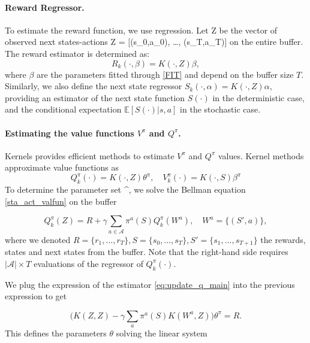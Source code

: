 \documentclass[
]{article}
\def\({}%
\def\){}%
\numberwithin{equation}{section}
\begin{document}
\paragraph*{Reward Regressor.} To estimate the reward function, we use regression. Let \(Z\) be the vector of observed next states-actions
\(Z = [(s_0,a_0), \dots, (s_T,a_T)]\) on the entire buffer. The reward estimator
is determined as:
\begin{equation} \label{eq:update_s_main}
R_{k}(\cdot, \beta) =   K(\cdot, Z)\beta,
\end{equation} where $\beta$ are the parameters fitted through \eqref{FIT} and depend on the buffer size $T$. Similarly, we also define the next state regressor $S_{k}(\cdot, \alpha) = K(\cdot, Z)\alpha$, providing an estimator of the next state function $S(\cdot)$ in the deterministic case, and the conditional expectation $\mathbb{E}[S(\cdot) | s, a]$ in the stochastic case.


\paragraph*{Estimating the value functions $V^\pi$ and $Q^\pi$.}

Kernels provides efficient methods to estimate $V^\pi$ and $Q^\pi$ values. Kernel methods approximate value functions as
\begin{equation} \label{eq:update_q_main}
Q_k^\pi(\cdot) = K(\cdot, Z) \theta^\pi, \quad V_k^\pi(\cdot) = K(\cdot, S) \beta^\pi
\end{equation}
To determine
the parameter set \(\theta^\pi\), we solve the Bellman
equation \eqref{sta_act_valfun} on the buffer

\begin{equation} \label{eq:BE}
Q_k^\pi(Z) = R + \gamma \sum_{a \in \mathcal{A}} \pi^a(S) Q_k^\pi(W^a), \quad W^a = \{(S',a)\},
\end{equation} where we denoted $R = \{r_1, \dots, r_T\} , S = \{s_0, \dots, s_T\}, S' = \{s_1, \dots, s_{T+1}\}$ the rewards, states and next states from the buffer. Note that the right-hand side requires $|\mathcal{A}| \times T$ evaluations of the regressor of $Q_k^\pi(\cdot)$. 

We plug the expression of the estimator \eqref{eq:update_q_main} into
the previous expression to get

\begin{equation} \label{eq:BE2}
\Big( K(Z, Z) - \gamma \sum_a \pi^a(S) K(W^a,Z) \Big)\theta^\pi = R.
\end{equation} 
This defines the parameters $\theta$ solving the linear system
\end{document}
